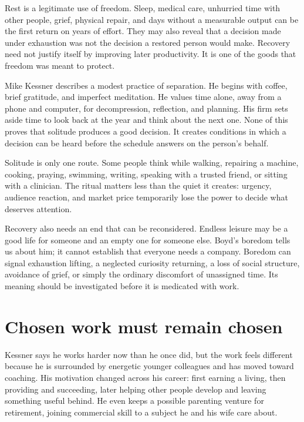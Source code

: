 Rest is a legitimate use of freedom. Sleep, medical care, unhurried time with
other people, grief, physical repair, and days without a measurable output can
be the first return on years of effort. They may also reveal that a decision
made under exhaustion was not the decision a restored person would make.
Recovery need not justify itself by improving later productivity. It is one of
the goods that freedom was meant to protect.

Mike Kessner describes a modest practice of separation. He begins with coffee,
brief gratitude, and imperfect meditation. He values time alone, away from a
phone and computer, for decompression, reflection, and planning. His firm sets
aside time to look back at the year and think about the next one. None of this
proves that solitude produces a good decision. It creates conditions in which
a decision can be heard before the schedule answers on the person's behalf.

Solitude is only one route. Some people think while walking, repairing a
machine, cooking, praying, swimming, writing, speaking with a trusted friend,
or sitting with a clinician. The ritual matters less than the quiet it creates:
urgency, audience reaction, and market price temporarily lose the power to
decide what deserves attention.

Recovery also needs an end that can be reconsidered. Endless leisure may be a
good life for someone and an empty one for someone else. Boyd's boredom tells
us about him; it cannot establish that everyone needs a company. Boredom can
signal exhaustion lifting, a neglected curiosity returning, a loss of social
structure, avoidance of grief, or simply the ordinary discomfort of
unassigned time. Its meaning should be investigated before it is medicated
with work.

\section{Chosen work must remain chosen}

Kessner says he works harder now than he once did, but the work feels different
because he is surrounded by energetic younger colleagues and has moved toward
coaching. His motivation changed across his career: first earning a living,
then providing and succeeding, later helping other people develop and leaving
something useful behind. He even keeps a possible parenting venture for
retirement, joining commercial skill to a subject he and his wife care about.

